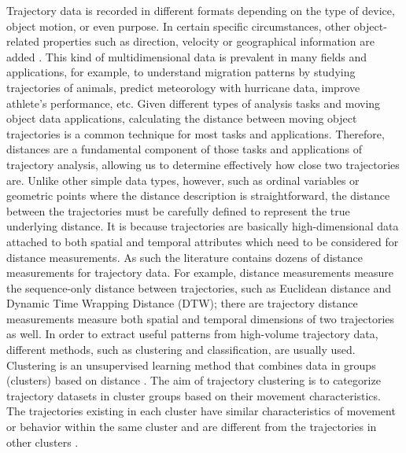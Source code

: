 \documentclass[a4paper, 12pt]{article}
\begin{document}
Trajectory data is recorded in different formats depending on the type of device, object motion, or even purpose. In certain specific circumstances, other object-related properties such as direction, velocity or geographical information are added \citep{ying2011semantic,ying2010mining}. This kind of multidimensional data is prevalent in many fields and applications, for example, to understand migration patterns by studying trajectories of animals, predict meteorology with hurricane data, improve athlete’s performance, etc. Given different types of analysis tasks and moving object data applications, calculating the distance between moving object trajectories is a common technique for most tasks and applications. Therefore, distances are a fundamental component of those tasks and applications of trajectory analysis, allowing us to determine effectively how close two trajectories are. Unlike other simple data types, however, such as ordinal variables or geometric points where the distance description is straightforward, the distance between the trajectories must be carefully defined to represent the true underlying distance. It is because trajectories are basically high-dimensional data attached to both spatial and temporal attributes which need to be considered for distance measurements. As such the literature contains dozens of distance measurements for trajectory data. For example, distance measurements measure the sequence-only distance between trajectories, such as Euclidean distance and Dynamic Time Wrapping Distance (DTW); there are trajectory distance measurements measure both spatial and temporal dimensions of two trajectories as well.
In order to extract useful patterns from high-volume trajectory data, different methods, such as clustering and classification, are usually used. Clustering is an unsupervised learning method that combines data in groups (clusters) based on distance \citep{han2011data,xu2005survey}. The aim of trajectory clustering is to categorize trajectory datasets in cluster groups based on their movement characteristics. The trajectories existing in each cluster have similar characteristics of movement or behavior within the same cluster and are different from the trajectories in other clusters \citep{berkhin2006survey,besse2015review,yuan2017review}.
\end{document}
